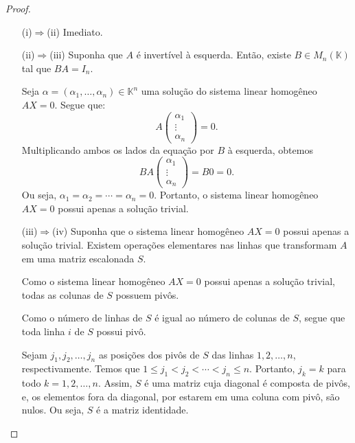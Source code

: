 \begin{proof}
    \begin{itemize}
        \item[(i)$\Rightarrow$(ii)] Imediato.

        \item[(ii)$\Rightarrow$(iii)] Suponha que $A$ é invertível à esquerda.
            Então, existe $B\in M_{n}(\mathbb K)$ tal que $BA=I_n$.

            Seja $\alpha=(\alpha_1, \dots, \alpha_n)\in \mathbb K^n$ uma solução do sistema linear homogêneo $AX=0$.
            Segue que:
            \begin{equation*}
                A\begin{pmatrix} \alpha_1 \\ \vdots \\ \alpha_n \end{pmatrix} = 0.
            \end{equation*}
            Multiplicando ambos os lados da equação por $B$ à esquerda, obtemos \begin{equation*}
                BA\begin{pmatrix} \alpha_1 \\ \vdots \\ \alpha_n \end{pmatrix} = B0=0.
            \end{equation*}
            Ou seja, $\alpha_1=\alpha_2=\cdots=\alpha_n=0$.
            Portanto, o sistema linear homogêneo $AX=0$ possui apenas a solução trivial.

        \item[(iii)$\Rightarrow$(iv)] Suponha que o sistema linear homogêneo $AX=0$ possui apenas a solução trivial.
        Existem operações elementares nas linhas que transformam $A$ em uma matriz escalonada $S$.

        Como o sistema linear homogêneo $AX=0$ possui apenas a solução trivial, todas as colunas de $S$ possuem pivôs.
        
        Como o número de linhas de $S$ é igual ao número de colunas de $S$, segue que toda linha $i$ de $S$ possui pivô.

        Sejam $j_1, j_2, \dots, j_n$ as posições dos pivôs de $S$ das linhas $1, 2, \dots, n$, respectivamente.
        Temos que $1\leq j_1 < j_2 < \cdots < j_n \leq n$.
        Portanto, $j_k=k$ para todo $k=1, 2, \dots, n$.
        Assim, $S$ é uma matriz cuja diagonal é composta de pivôs, e, os elementos fora da diagonal, por estarem em uma coluna com pivô, são nulos.
        Ou seja, $S$ é a matriz identidade.


\end{itemize}
\end{proof}

